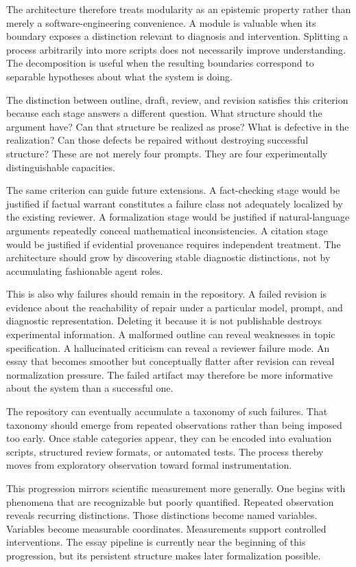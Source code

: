 \documentclass[11pt]{article}
\begin{document}
The architecture therefore treats modularity as an epistemic property rather than merely a software-engineering convenience. A module is valuable when its boundary exposes a distinction relevant to diagnosis and intervention. Splitting a process arbitrarily into more scripts does not necessarily improve understanding. The decomposition is useful when the resulting boundaries correspond to separable hypotheses about what the system is doing.

The distinction between outline, draft, review, and revision satisfies this criterion because each stage answers a different question. What structure should the argument have? Can that structure be realized as prose? What is defective in the realization? Can those defects be repaired without destroying successful structure? These are not merely four prompts. They are four experimentally distinguishable capacities.

The same criterion can guide future extensions. A fact-checking stage would be justified if factual warrant constitutes a failure class not adequately localized by the existing reviewer. A formalization stage would be justified if natural-language arguments repeatedly conceal mathematical inconsistencies. A citation stage would be justified if evidential provenance requires independent treatment. The architecture should grow by discovering stable diagnostic distinctions, not by accumulating fashionable agent roles.

This is also why failures should remain in the repository. A failed revision is evidence about the reachability of repair under a particular model, prompt, and diagnostic representation. Deleting it because it is not publishable destroys experimental information. A malformed outline can reveal weaknesses in topic specification. A hallucinated criticism can reveal a reviewer failure mode. An essay that becomes smoother but conceptually flatter after revision can reveal normalization pressure. The failed artifact may therefore be more informative about the system than a successful one.

The repository can eventually accumulate a taxonomy of such failures. That taxonomy should emerge from repeated observations rather than being imposed too early. Once stable categories appear, they can be encoded into evaluation scripts, structured review formats, or automated tests. The process thereby moves from exploratory observation toward formal instrumentation.

This progression mirrors scientific measurement more generally. One begins with phenomena that are recognizable but poorly quantified. Repeated observation reveals recurring distinctions. Those distinctions become named variables. Variables become measurable coordinates. Measurements support controlled interventions. The essay pipeline is currently near the beginning of this progression, but its persistent structure makes later formalization possible.
\end{document}
